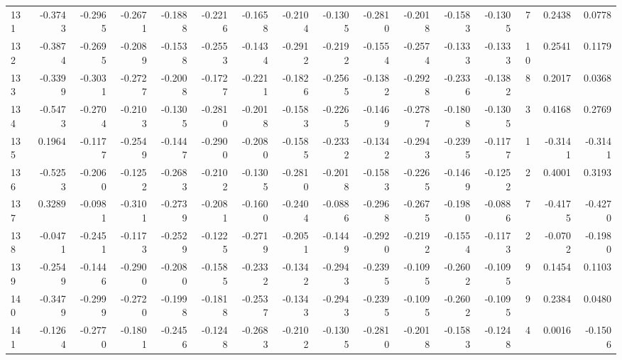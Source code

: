 \begin{tabular}{lrrrrrrrrrrrrrrr}
131 &     -0.3743 & -0.2965 & -0.2671 & -0.1888 & -0.2216 & -0.1658 & -0.2104 & -0.1305 & -0.2810 & -0.2018 &  -0.1583 &    -0.1305 &      7 &                    0.2438 &                     0.0778 \\
132 &     -0.3874 & -0.2695 & -0.2089 & -0.1538 & -0.2553 & -0.1434 & -0.2912 & -0.2192 & -0.1554 & -0.2574 &  -0.1333 &    -0.1333 &     10 &                    0.2541 &                     0.1179 \\
133 &     -0.3399 & -0.3031 & -0.2727 & -0.2008 & -0.1727 & -0.2211 & -0.1826 & -0.2565 & -0.1382 & -0.2928 &  -0.2336 &    -0.1382 &      8 &                    0.2017 &                     0.0368 \\
134 &     -0.5473 & -0.2704 & -0.2103 & -0.1305 & -0.2810 & -0.2018 & -0.1583 & -0.2265 & -0.1469 & -0.2787 &  -0.1808 &    -0.1305 &      3 &                    0.4168 &                     0.2769 \\
135 &      0.1964 & -0.1177 & -0.2549 & -0.1447 & -0.2900 & -0.2080 & -0.1585 & -0.2332 & -0.1342 & -0.2943 &  -0.2395 &    -0.1177 &      1 &                   -0.3141 &                    -0.3141 \\
136 &     -0.5253 & -0.2060 & -0.1252 & -0.2683 & -0.2102 & -0.1305 & -0.2810 & -0.2018 & -0.1583 & -0.2265 &  -0.1469 &    -0.1252 &      2 &                    0.4001 &                     0.3193 \\
137 &      0.3289 & -0.0981 & -0.3101 & -0.2739 & -0.2081 & -0.1600 & -0.2404 & -0.0886 & -0.2968 & -0.2675 &  -0.1980 &    -0.0886 &      7 &                   -0.4175 &                    -0.4270 \\
138 &     -0.0471 & -0.2451 & -0.1173 & -0.2529 & -0.1225 & -0.2719 & -0.2051 & -0.1449 & -0.2920 & -0.2192 &  -0.1554 &    -0.1173 &      2 &                   -0.0702 &                    -0.1980 \\
139 &     -0.2549 & -0.1446 & -0.2900 & -0.2080 & -0.1585 & -0.2332 & -0.1342 & -0.2943 & -0.2395 & -0.1095 &  -0.2602 &    -0.1095 &      9 &                    0.1454 &                     0.1103 \\
140 &     -0.3479 & -0.2999 & -0.2720 & -0.1998 & -0.1818 & -0.2537 & -0.1343 & -0.2943 & -0.2395 & -0.1095 &  -0.2602 &    -0.1095 &      9 &                    0.2384 &                     0.0480 \\
141 &     -0.1264 & -0.2770 & -0.1801 & -0.2456 & -0.1248 & -0.2683 & -0.2102 & -0.1305 & -0.2810 & -0.2018 &  -0.1583 &    -0.1248 &      4 &                    0.0016 &                    -0.1506 \\

\end{tabular}
